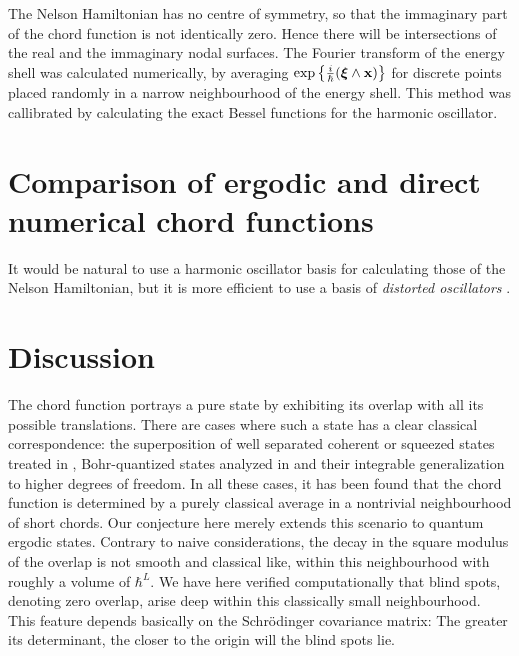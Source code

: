 \documentclass[12pt]{iopart}
\newcommand{\x}{{\mathbf x}}
\newcommand{\vct}[1]{\ensuremath\mbox{\boldmath$ #1 $}}
\newcommand{\Vxi}{\vct \xi}
\begin{document}
The Nelson Hamiltonian has no centre of symmetry, so that the immaginary part of the chord function
is not identically zero. Hence there will be intersections of the real and the immaginary
nodal surfaces. The Fourier transform of the energy shell was calculated numerically,
by averaging $\exp\left\{\frac{i}{\hbar}(\Vxi\wedge \x)\right\}$ for discrete points 
placed randomly in a narrow neighbourhood of the energy shell. This method was callibrated
by calculating the exact Bessel functions for the harmonic oscillator.




\section{Comparison of ergodic and direct numerical chord functions}

It would be natural to use a harmonic oscillator basis 
for calculating those of the Nelson Hamiltonian,
but it is more efficient to use a basis of {\it distorted oscillators} \cite{TosOa99}.
 







\section{Discussion}





The chord function portrays a pure state by exhibiting its overlap with all its possible translations.
There are cases where such a state has a clear classical correspondence: the superposition of well
separated coherent or squeezed states treated in \cite{ZO}, Bohr-quantized states analyzed in \cite{ZOA10}
and their integrable generalization to higher degrees of freedom. In all these cases, it has been found
that the chord function is determined by a purely classical average in a nontrivial neighbourhood of short chords.
Our conjecture here merely extends this scenario to quantum ergodic states.
Contrary to naive considerations, the decay in the square modulus of the overlap is not smooth 
and classical like, within this neighbourhood with roughly a volume of $\hbar^L$. 
We have here verified computationally that blind spots, denoting zero overlap, 
arise deep within this classically small neighbourhood.
This feature depends basically on the Schr\"odinger covariance matrix: The greater its determinant,
the closer to the origin will the blind spots lie.  
\end{document}
